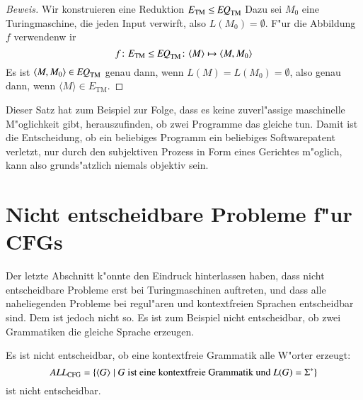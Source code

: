 \begin{proof}[Beweis]
Wir konstruieren eine Reduktion
$
E_{\text{TM}}\le \text{\it EQ}_{\text{TM}}
$
Dazu sei $M_0$ eine Turingmaschine, die jeden Input verwirft,
also $L(M_0)=\emptyset$.
F"ur die Abbildung $f$ verwendenw ir
\[
f
\colon
E_{\text{TM}}\le \text{\it EQ}_{\text{TM}}
\colon
\langle M\rangle\mapsto \langle M,M_0\rangle
\]
Es ist $\langle M,M_0\rangle\in \text{\it EQ}_{\text{TM}}$
genau dann, wenn
$L(M)=L(M_0)=\emptyset$, also genau dann, wenn
$\langle M\rangle\in E_{\text{TM}}$.
\end{proof}

Dieser Satz hat zum Beispiel zur Folge, dass es keine zuverl"assige
maschinelle
M"oglichkeit gibt, herauszufinden, ob zwei Programme das gleiche tun.
Damit ist die Entscheidung, ob ein beliebiges Programm ein beliebiges
Softwarepatent verletzt, nur durch den subjektiven Prozess in Form
eines Gerichtes m"oglich, kann also grunds"atzlich niemals objektiv sein.

\section{Nicht entscheidbare Probleme f"ur CFGs}
Der letzte Abschnitt k"onnte den Eindruck hinterlassen haben,
dass nicht entscheidbare Probleme erst bei Turingmaschinen
auftreten, und dass alle naheliegenden Probleme bei regul"aren
und kontextfreien Sprachen entscheidbar sind. Dem ist jedoch
nicht so. Es ist zum Beispiel nicht entscheidbar, ob zwei
Grammatiken die gleiche Sprache erzeugen.

\begin{satz} Es ist nicht entscheidbar, ob eine kontextfreie
Grammatik alle W"orter erzeugt:
\[
\text{\it ALL}_{\text{CFG}}=\{\langle G\rangle\;|\; \text{$G$
ist eine kontextfreie Grammatik und $L(G)=\Sigma^*$}\}
\]
ist nicht entscheidbar.
\end{satz}

